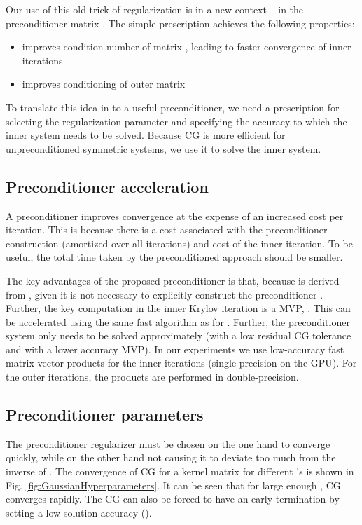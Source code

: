 \documentclass[10pt,journal,letterpaper,compsoc]{IEEEtran}
\begin{document}
Our use of this old trick of regularization is in a new context -- in the preconditioner matrix . The simple prescription achieves the following properties:
\begin{itemize}
\item improves condition number of matrix , leading to faster convergence of inner iterations
\item improves conditioning of outer matrix 
\end{itemize}
To translate this idea in to a useful preconditioner, we need a prescription for selecting the regularization parameter  and specifying the accuracy  to which the inner system needs to be solved. Because CG is more efficient for unpreconditioned symmetric systems, we use it to solve the inner system.

\subsection{Preconditioner acceleration}
A preconditioner improves convergence at the expense of an increased cost per iteration. This is because there is a cost associated with the preconditioner construction (amortized over all iterations) and cost of the inner iteration. To be useful, the total time taken by the preconditioned approach should be smaller.

The key advantages of the proposed preconditioner is that, because  is derived from , given  it is not necessary to explicitly construct the preconditioner . Further, the key computation in the inner Krylov iteration is a MVP, . This can be accelerated using the same fast algorithm as for . Further, the preconditioner system only needs to be solved approximately (with a low residual CG tolerance and with a lower accuracy MVP). In our experiments we use low-accuracy fast matrix vector products for the inner iterations (single precision on the GPU). For the outer iterations, the products are performed in double-precision.

\subsection{Preconditioner parameters}
The preconditioner regularizer  must be chosen on the one hand to converge quickly, while on the other hand not causing it to deviate too much from the inverse of . The convergence of CG for a kernel matrix for different 's is shown in Fig. \ref{fig:GaussianHyperparameters}. It can be seen that for large enough , CG converges rapidly. The CG can also be forced to have an early termination by setting a low solution accuracy ().
\end{document}
